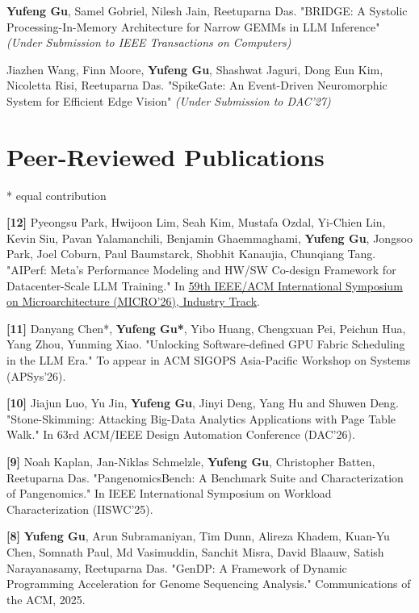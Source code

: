 \documentclass[10pt,a4paper,palatine]{moderncv}        %
\begin{document}
\textbf{Yufeng Gu}, Samel Gobriel, Nilesh Jain, Reetuparna Das. "BRIDGE: A Systolic Processing-In-Memory Architecture for Narrow GEMMs in LLM Inference"
\textit{(Under Submission to IEEE Transactions on Computers)}



Jiazhen Wang, Finn Moore, \textbf{Yufeng Gu}, Shashwat Jaguri, Dong Eun Kim,
Nicoletta Risi, Reetuparna Das. 
"SpikeGate: An Event-Driven Neuromorphic System for Efficient Edge Vision"
\textit{(Under Submission to DAC'27)}

\section{Peer-Reviewed Publications}
\vspace{-2mm} 

* equal contribution

\textbf{[12]} Pyeongsu Park, Hwijoon Lim, Seah Kim, Mustafa Ozdal, Yi-Chien Lin, Kevin Siu, Pavan Yalamanchili, Benjamin Ghaemmaghami, \textbf{Yufeng Gu}, Jongsoo Park, Joel Coburn, Paul Baumstarck, Shobhit Kanaujia, Chunqiang Tang. "AIPerf: Meta's Performance Modeling and HW/SW Co-design Framework for Datacenter-Scale LLM Training." In \href{https://www.microarch.org/micro59/program/}{59th IEEE/ACM International Symposium on Microarchitecture (MICRO'26), Industry Track}.

\textbf{[11]} Danyang Chen*, \textbf{Yufeng Gu*}, Yibo Huang, Chengxuan Pei, Peichun Hua, Yang Zhou, Yunming Xiao. "Unlocking Software-defined GPU Fabric Scheduling in the LLM Era." To appear in ACM SIGOPS Asia-Pacific Workshop on Systems (APSys'26).


\textbf{[10]} Jiajun Luo, Yu Jin, \textbf{Yufeng Gu}, Jinyi Deng, Yang Hu and Shuwen Deng. "Stone-Skimming: Attacking Big-Data Analytics Applications with Page Table Walk." In 63rd ACM/IEEE Design Automation Conference (DAC'26).

\textbf{[9]} Noah Kaplan, Jan-Niklas Schmelzle, \textbf{Yufeng Gu}, Christopher Batten, Reetuparna Das. "PangenomicsBench: A Benchmark Suite and Characterization of Pangenomics." In IEEE International Symposium on Workload Characterization (IISWC'25).

\textbf{[8]} \textbf{Yufeng Gu}, Arun Subramaniyan, Tim Dunn, Alireza Khadem, Kuan-Yu Chen, Somnath Paul, Md Vasimuddin, Sanchit Misra, David Blaauw, Satish Narayanasamy, Reetuparna Das. "GenDP: A Framework of Dynamic Programming Acceleration for Genome Sequencing Analysis." Communications of the ACM, 2025.
\end{document}
